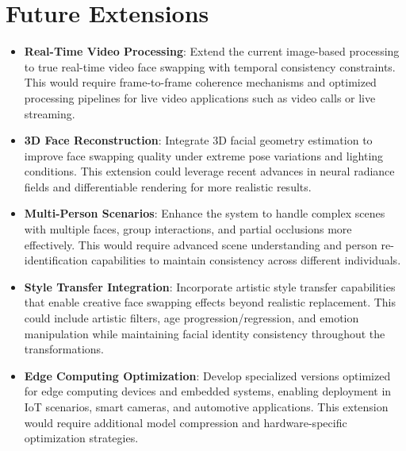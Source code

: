 \documentclass[12pt,a4paper]{report}
\begin{document}
\section{Future Extensions}

\begin{itemize}
\item \textbf{Real-Time Video Processing}: Extend the current image-based processing to true real-time video face swapping with temporal consistency constraints. This would require frame-to-frame coherence mechanisms and optimized processing pipelines for live video applications such as video calls or live streaming.

\item \textbf{3D Face Reconstruction}: Integrate 3D facial geometry estimation to improve face swapping quality under extreme pose variations and lighting conditions. This extension could leverage recent advances in neural radiance fields and differentiable rendering for more realistic results.

\item \textbf{Multi-Person Scenarios}: Enhance the system to handle complex scenes with multiple faces, group interactions, and partial occlusions more effectively. This would require advanced scene understanding and person re-identification capabilities to maintain consistency across different individuals.

\item \textbf{Style Transfer Integration}: Incorporate artistic style transfer capabilities that enable creative face swapping effects beyond realistic replacement. This could include artistic filters, age progression/regression, and emotion manipulation while maintaining facial identity consistency throughout the transformations.

\item \textbf{Edge Computing Optimization}: Develop specialized versions optimized for edge computing devices and embedded systems, enabling deployment in IoT scenarios, smart cameras, and automotive applications. This extension would require additional model compression and hardware-specific optimization strategies.
\end{itemize}


\end{document}
